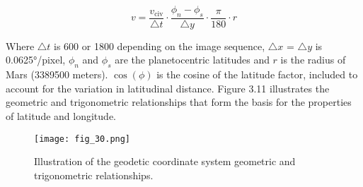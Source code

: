 \begin{equation}
v = \frac{v_{\text{civ}}}{\triangle t} \cdot \frac{\phi_n - \phi_s}{\triangle y} \cdot \frac{\pi}{180} \cdot r
\end{equation}

Where \( \triangle t\) is 600 or 1800 depending on the image sequence, \( \triangle x\) = \( \triangle y\) is 0.0625°/pixel,  \( \phi_n\) and \( \phi_s\) are the planetocentric latitudes and \( r\) is the radius of Mars (3389500 meters). \( \cos(\phi)\) is the cosine of the latitude factor, included to account for the variation in latitudinal distance. Figure 3.11 illustrates the geometric and trigonometric relationships that form the basis for the properties of latitude and longitude.
\FloatBarrier
\begin{figure}[h!] 
    \centering
    \texttt{[image: fig\_30.png]}
    \caption{Illustration of the geodetic coordinate system geometric and trigonometric relationships\cite{ISO18026}.}
\end{figure}
\FloatBarrier